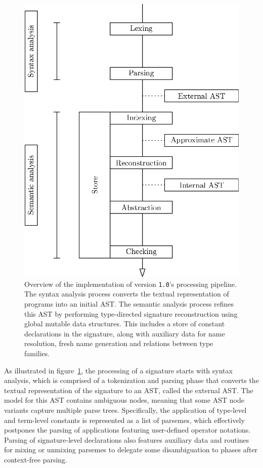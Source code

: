 \begin{figure}
\centering
\includegraphics{figures/legacy-beluga-processing-pipeline.eps}
\caption[Overview of \Beluga version \texttt{1.0}'s processing pipeline]{%
Overview of the implementation of \Beluga version \texttt{1.0}'s processing pipeline.
The syntax analysis process converts the textual representation of \Beluga programs into an initial \acs{AST}.
The semantic analysis process refines this \acs{AST} by performing type-directed signature reconstruction using global mutable data structures.
This includes a store of constant declarations in the signature, along with auxiliary data for name resolution, fresh name generation and relations between type families.
}
\label{figure:legacy-beluga-processing-pipeline}
\end{figure}

As illustrated in figure~\ref{figure:legacy-beluga-processing-pipeline}, the processing of a \Beluga signature starts with syntax analysis, which is comprised of a tokenization and parsing phase that converts the textual representation of the signature to an \ac{AST}, called the external \ac{AST}.
The model for this \ac{AST} contains ambiguous nodes, meaning that some \ac{AST} node variants capture multiple parse trees.
Specifically, the application of \LF type-level and term-level constants is represented as a list of parsemes, which effectively postpones the parsing of applications featuring user-defined operator notations.
Parsing of signature-level declarations also features auxiliary data and routines for mixing or unmixing parsemes to delegate some disambiguation to phases after context-free parsing.

